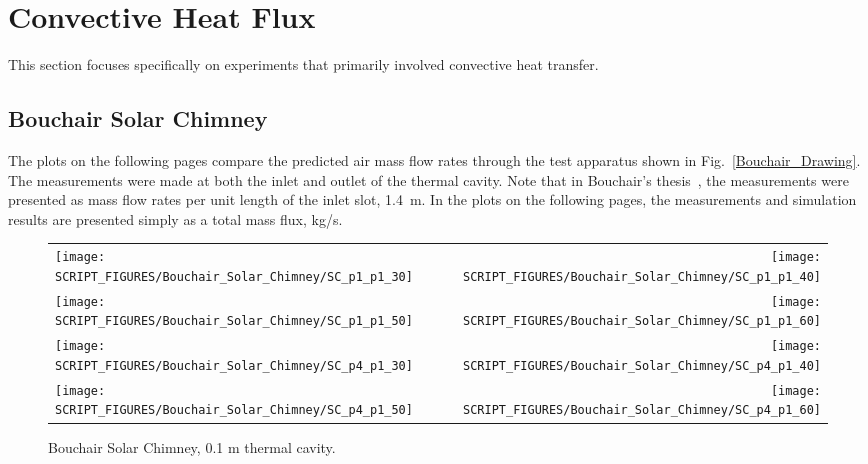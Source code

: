 \clearpage

\section{Convective Heat Flux}

This section focuses specifically on experiments that primarily involved convective heat transfer.

\subsection{Bouchair Solar Chimney}

The plots on the following pages compare the predicted air mass flow rates through the test apparatus shown in Fig.~\ref{Bouchair_Drawing}. The measurements were made at both the inlet and outlet of the thermal cavity. Note that in Bouchair's thesis~\cite{Bouchair:Thesis}, the measurements were presented as mass flow rates per unit length of the inlet slot, 1.4~m. In the plots on the following pages, the measurements and simulation results are presented simply as a total mass flux, kg/s.

\begin{figure}[p]
\begin{tabular*}{\textwidth}{l@{\extracolsep{\fill}}r}
\texttt{[image: SCRIPT\_FIGURES/Bouchair\_Solar\_Chimney/SC\_p1\_p1\_30]} &
\texttt{[image: SCRIPT\_FIGURES/Bouchair\_Solar\_Chimney/SC\_p1\_p1\_40]} \\
\texttt{[image: SCRIPT\_FIGURES/Bouchair\_Solar\_Chimney/SC\_p1\_p1\_50]} &
\texttt{[image: SCRIPT\_FIGURES/Bouchair\_Solar\_Chimney/SC\_p1\_p1\_60]} \\
\texttt{[image: SCRIPT\_FIGURES/Bouchair\_Solar\_Chimney/SC\_p4\_p1\_30]} &
\texttt{[image: SCRIPT\_FIGURES/Bouchair\_Solar\_Chimney/SC\_p4\_p1\_40]} \\
\texttt{[image: SCRIPT\_FIGURES/Bouchair\_Solar\_Chimney/SC\_p4\_p1\_50]} &
\texttt{[image: SCRIPT\_FIGURES/Bouchair\_Solar\_Chimney/SC\_p4\_p1\_60]}
\end{tabular*}
\caption[Bouchair Solar Chimney, 0.1 m thermal cavity]{Bouchair Solar Chimney, 0.1 m thermal cavity.}
\label{Bouchair_p1}
\end{figure}

